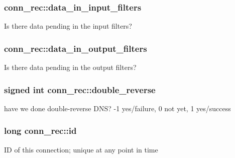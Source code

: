 \subsubsection[{\texorpdfstring{data\+\_\+in\+\_\+input\+\_\+filters}{data_in_input_filters}}]{ conn\+\_\+rec\+::data\+\_\+in\+\_\+input\+\_\+filters}\hypertarget{structconn__rec_adce1899d39e3d6ae4d08a3ff248e49e8}{}\label{structconn__rec_adce1899d39e3d6ae4d08a3ff248e49e8}
Is there data pending in the input filters? 
\subsubsection[{\texorpdfstring{data\+\_\+in\+\_\+output\+\_\+filters}{data_in_output_filters}}]{ conn\+\_\+rec\+::data\+\_\+in\+\_\+output\+\_\+filters}\hypertarget{structconn__rec_a148edf3d5ae7140635f46d719aba83fd}{}\label{structconn__rec_a148edf3d5ae7140635f46d719aba83fd}
Is there data pending in the output filters? 
\subsubsection[{\texorpdfstring{double\+\_\+reverse}{double_reverse}}]{\setlength{\rightskip}{0pt plus 5cm}signed {\bf int} conn\+\_\+rec\+::double\+\_\+reverse}\hypertarget{structconn__rec_a778097ac76492a50392c44609edb9acc}{}\label{structconn__rec_a778097ac76492a50392c44609edb9acc}
have we done double-\/reverse D\+NS? -\/1 yes/failure, 0 not yet, 1 yes/success 
\subsubsection[{\texorpdfstring{id}{id}}]{\setlength{\rightskip}{0pt plus 5cm}long conn\+\_\+rec\+::id}\hypertarget{structconn__rec_af90d018c333fca6f3ef0f29375b86dc1}{}\label{structconn__rec_af90d018c333fca6f3ef0f29375b86dc1}
ID of this connection; unique at any point in time 
